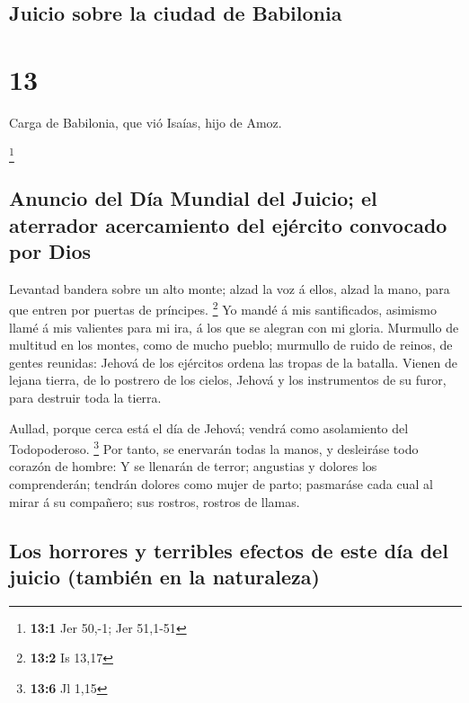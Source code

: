 \hypertarget{juicio-sobre-la-ciudad-de-babilonia}{%
\subsection{Juicio sobre la ciudad de
Babilonia}\label{juicio-sobre-la-ciudad-de-babilonia}}

\hypertarget{section-12}{%
\section{13}\label{section-12}}

 Carga de Babilonia, que vió Isaías, hijo de Amoz.

\footnote{\textbf{13:1} Jer 50,-1; Jer 51,1-51}

\hypertarget{anuncio-del-duxeda-mundial-del-juicio-el-aterrador-acercamiento-del-ejuxe9rcito-convocado-por-dios}{%
\subsection{Anuncio del Día Mundial del Juicio; el aterrador
acercamiento del ejército convocado por
Dios}\label{anuncio-del-duxeda-mundial-del-juicio-el-aterrador-acercamiento-del-ejuxe9rcito-convocado-por-dios}}

 Levantad bandera sobre un alto monte; alzad la voz á
ellos, alzad la mano, para que entren por puertas de príncipes.
\footnote{\textbf{13:2} Is 13,17}  Yo mandé á mis
santificados, asimismo llamé á mis valientes para mi ira, á los que se
alegran con mi gloria.  Murmullo de multitud en los
montes, como de mucho pueblo; murmullo de ruido de reinos, de gentes
reunidas: Jehová de los ejércitos ordena las tropas de la batalla.
 Vienen de lejana tierra, de lo postrero de los cielos,
Jehová y los instrumentos de su furor, para destruir toda la tierra.

 Aullad, porque cerca está el día de Jehová; vendrá como
asolamiento del Todopoderoso. \footnote{\textbf{13:6} Jl 1,15}
 Por tanto, se enervarán todas la manos, y desleiráse todo
corazón de hombre:  Y se llenarán de terror; angustias y
dolores los comprenderán; tendrán dolores como mujer de parto; pasmaráse
cada cual al mirar á su compañero; sus rostros, rostros de llamas.

\hypertarget{los-horrores-y-terribles-efectos-de-este-duxeda-del-juicio-tambiuxe9n-en-la-naturaleza}{%
\subsection{Los horrores y terribles efectos de este día del juicio
(también en la
naturaleza)}\label{los-horrores-y-terribles-efectos-de-este-duxeda-del-juicio-tambiuxe9n-en-la-naturaleza}}

